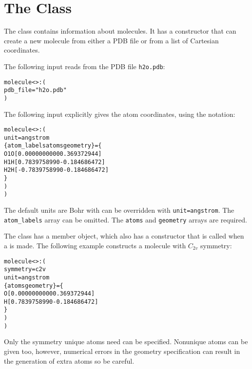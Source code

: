 

\section{The  Class}\label{Molecule}

The  class contains information about molecules.  It has a
 constructor that can create a new molecule from either a
PDB file or from a list of Cartesian coordinates.

The following  input reads from the PDB
file \verb|h2o.pdb|:
\begin{alltt}
molecule<>: (
   pdb_file = "h2o.pdb"
 )
\end{alltt}

The following input explicitly gives the atom coordinates, using the
  notation:
\begin{alltt}
molecule<>: (
    unit=angstrom
    \{ atom_labels atoms           geometry            \} = \{
          O1         O   [ 0.000000000 0  0.369372944 ]
          H1         H   [ 0.783975899 0 -0.184686472 ]
          H2         H   [-0.783975899 0 -0.184686472 ]
     \}
    )
  )
\end{alltt}
The default units are Bohr with can be overridden with
\verb|unit=angstrom|.  The \verb|atom_labels| array can be
omitted.  The \verb|atoms| and \verb|geometry| arrays
are required.

The  class has a 
member object, which also has a  constructor
that is called when a  is made.  The
following example constructs a molecule with $C_{2v}$ symmetry:
\begin{alltt}
molecule<>: (
    symmetry=c2v
    unit=angstrom
    \{ atoms         geometry            \} = \{
        O   [0.000000000 0  0.369372944 ]
        H   [0.783975899 0 -0.184686472 ]
     \}
    )
  )
\end{alltt}
Only the symmetry unique atoms need can be specified.  Nonunique
atoms can be given too, however, numerical errors in the
geometry specification can result in the generation of extra
atoms so be careful.


